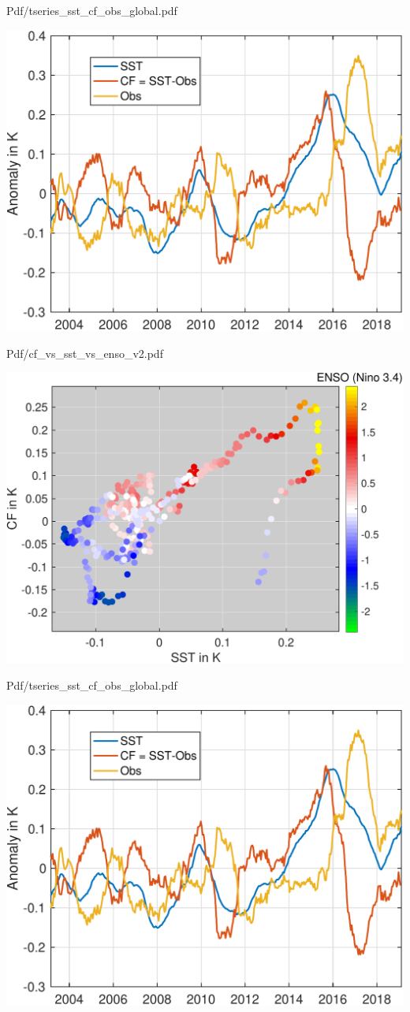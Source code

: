 \documentclass[presentation]{beamer}
\begin{document}
\begin{frame}[label={sec:orgd5fcb3c}]{Pdf/tseries\_sst\_cf\_obs\_global.pdf}
\begin{center}
\includegraphics[width=0.7\linewidth]{./Figs/Pdf/tseries_sst_cf_obs_global.pdf}
\end{center}
\end{frame}

\begin{frame}[label={sec:org4611d8a}]{Pdf/cf\_vs\_sst\_vs\_enso\_v2.pdf}
\begin{center}
\includegraphics[width=0.7\linewidth]{./Figs/Pdf/cf_vs_sst_vs_enso_v2.pdf}
\end{center}
\end{frame}

\begin{frame}[label={sec:orgc406dae}]{Pdf/tseries\_sst\_cf\_obs\_global.pdf}
\begin{center}
\includegraphics[width=0.7\linewidth]{./Figs/Pdf/tseries_sst_cf_obs_global.pdf}
\end{center}
\end{frame}
\end{document}
